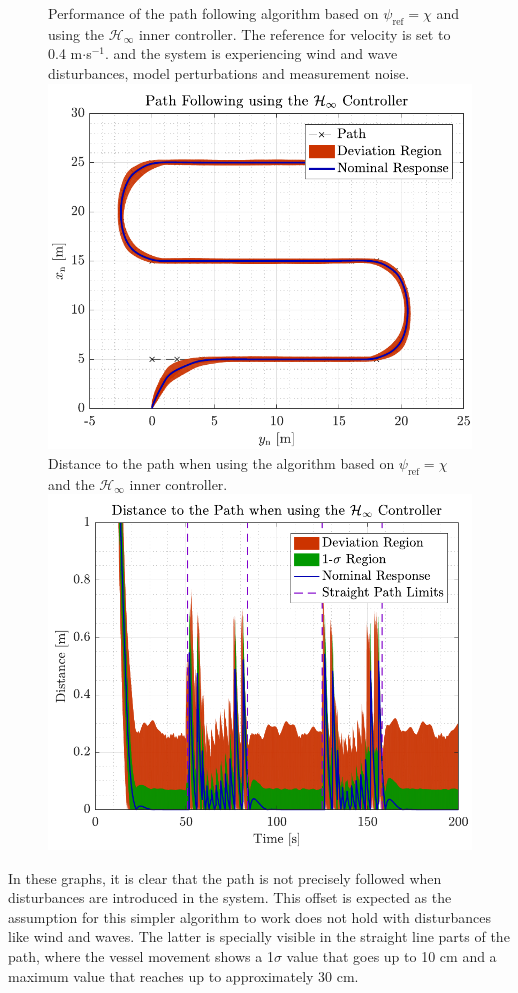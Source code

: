 \begin{figure}[H]
	\captionbox 
	{   
		Performance of the path following algorithm based on $\psi_\mathrm{ref}=\chi$ and using the $\mathcal{H}_\infty$ inner controller. The reference for velocity is set to \num{0.4} m$\cdot$s$^{-1}$. and the system is experiencing wind and wave disturbances, model perturbations and measurement noise. \label{fig:robwrong}      
	}                                                                 
	{                                                                  
		\includegraphics[width=.45\textwidth]{figures/path_rob_no_correc}         
	}                                                                    
	\hspace{5pt}                                                          
	\captionbox  
	{      
		Distance to the path when using the algorithm based on $\psi_\mathrm{ref}=\chi$ and the $\mathcal{H}_\infty$ inner controller.\label{fig:distrobwrong}
	}                                                                          
	{
		\includegraphics[width=.45\textwidth]{figures/dist_rob_no_correc}
	}
\end{figure}

In these graphs, it is clear that the path is not precisely followed when disturbances are introduced in the system. This offset is expected as the assumption for this simpler algorithm to work does not hold with disturbances like wind and waves. The latter is specially visible in the straight line parts of the path, where the vessel movement shows a 1$\sigma$ value that goes up to 10 cm and a maximum value that reaches up to approximately 30 cm.

